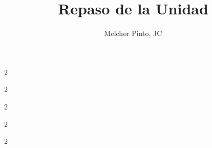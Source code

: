 \documentclass[12pt,addpoints]{repaso}
\title{Repaso de la Unidad}
\author{Melchor Pinto, JC}
\begin{document}
\ejemplosboxed[]
\begin{questions}
    \questionboxed[5]{}
    \questionboxed[5]{}
\newpage

    \begin{multicols}{2}
    \ejemplosboxed[]
     \ejemplosboxed[]
    \end{multicols}
    
    \begin{multicols}{2}
        \questionboxed[5]{}
         \questionboxed[5]{}
    \end{multicols}

    \begin{multicols}{2}
    \questionboxed[5]{}
    \questionboxed[5]{}
    \end{multicols}

    \begin{multicols}{2}
    \questionboxed[5]{}
    \questionboxed[5]{}
    \end{multicols}

    \questionboxed[5]{}
    \questionboxed[10]{}

    \questionboxed[5]{}
    \questionboxed[5]{}
    \questionboxed[5]{}
    \questionboxed[5]{}

    
    \begin{multicols}{2}
    \questionboxed[15]{}
    \questionboxed[5]{}
    \end{multicols}

    \questionboxed[5]{}


\end{questions}
\begin{landscape}
    \begin{minipage}[b]{\textwidth}
        \thispagestyle{foot}
        \begin{table}[H]
            \centering
            \caption{Tabla Peri\'odica de los Elementos.}
            \TablaPeriodica[0.48]
            \label{tab:periodic_table}
        \end{table}
    \end{minipage}
\end{landscape}
\end{document}
